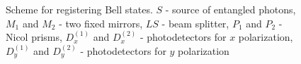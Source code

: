 \begin{figure}
\centering


\caption{Scheme for registering Bell states. $S$ - source
  of entangled photons, $M_1$ and $M_2$ - two fixed mirrors, $LS$ -
  beam splitter, $P_1$ and $P_2$ - Nicol prisms, $D^{(1)}_x$ and
  $D^{(2)}_x$ - photodetectors for $x$ polarization, $D^{(1)}_y$ and
  $D^{(2)}_y$ - photodetectors for $y$ polarization}
\label{figBellReg2}
\end{figure}